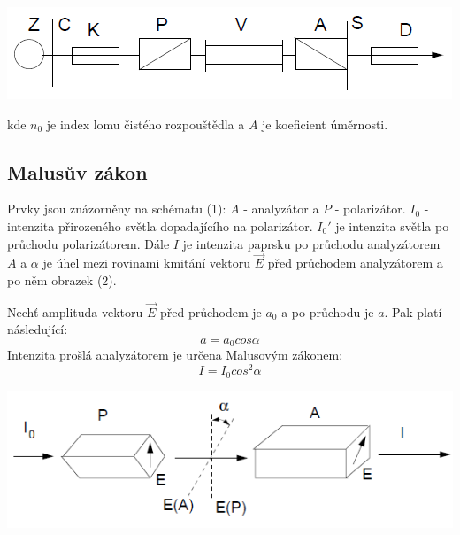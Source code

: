 \documentclass[a4paper,11pt]{article}
\begin{document}
    \begin{minipage}[t]{0.5\textwidth} 
                \vspace{-10pt}
                \par \centering
                \includegraphics[scale=0.6]{polar}
                \captionsetup{justification=centering, font=footnotesize}
                \label{fig:polar}
                \vspace{10pt}
                \raggedright
                \par kde $n_0$ je index lomu čistého rozpouštědla a $A$ je koeficient úměrnosti.
            \subsection{Malusův zákon}
                Prvky jsou znázorněny na schématu (1): $A$ - analyzátor a $P$ - polarizátor. $I_0$ - intenzita přirozeného světla dopadajícího na polarizátor. $I_0'$ je intenzita světla po průchodu polarizátorem. Dále $I$ je intenzita paprsku po průchodu analyzátorem $A$ a $\alpha$ je úhel mezi rovinami kmitání vektoru $\overrightarrow{E}$ před průchodem analyzátorem a po něm obrazek (2). 
                \par Nechť amplituda vektoru $\overrightarrow{E}$ před průchodem je $a_0$ a po průchodu je $a$. Pak platí následující:
                \begin{equation}
                    a = a_0 cos\alpha
                \end{equation}
                Intenzita prošlá analyzátorem je určena Malusovým zákonem:
                \begin{equation}
                    I = I_0 cos^2\alpha
                \end{equation}
                \par \centering
                \includegraphics[scale=0.6]{mus}
                \captionsetup{justification=centering, font=footnotesize}
                \label{fig:mus}
                \vspace{10pt}
                \raggedright
    \end{minipage}
\end{document}
